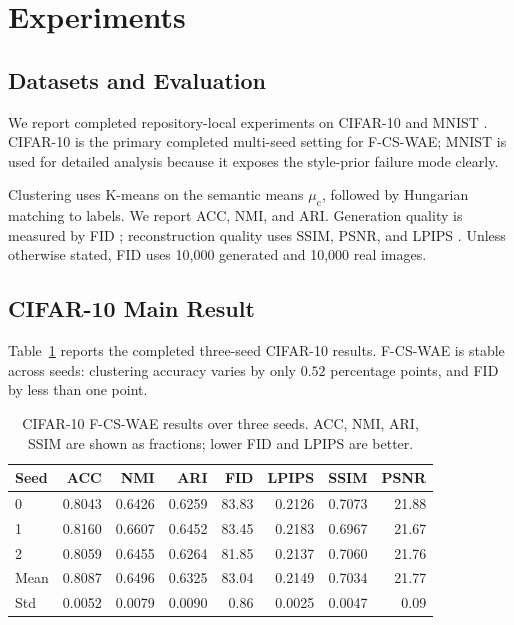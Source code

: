 \documentclass[10pt]{article}
\newcommand{\ours}{F-CS-WAE}
\begin{document}
\section{Experiments}

\subsection{Datasets and Evaluation}

We report completed repository-local experiments on CIFAR-10 \citep{krizhevsky2009learning} and MNIST \citep{lecun1998gradient}. CIFAR-10 is the primary completed multi-seed setting for \ours{}; MNIST is used for detailed analysis because it exposes the style-prior failure mode clearly.

Clustering uses K-means on the semantic means $\mu_{\mathrm{c}}$, followed by Hungarian matching to labels. We report ACC, NMI, and ARI. Generation quality is measured by FID \citep{heusel2017gans}; reconstruction quality uses SSIM, PSNR, and LPIPS \citep{zhang2018unreasonable}. Unless otherwise stated, FID uses 10,000 generated and 10,000 real images.

\subsection{CIFAR-10 Main Result}

Table~\ref{tab:cifar-main} reports the completed three-seed CIFAR-10 results. \ours{} is stable across seeds: clustering accuracy varies by only $0.52$ percentage points, and FID by less than one point.

\begin{table}[t]
\centering
\caption{CIFAR-10 \ours{} results over three seeds. ACC, NMI, ARI, SSIM are shown as fractions; lower FID and LPIPS are better.}
\label{tab:cifar-main}
\begin{tabular}{lrrrrrrr}
\toprule
Seed & ACC & NMI & ARI & FID & LPIPS & SSIM & PSNR \\
\midrule
0 & 0.8043 & 0.6426 & 0.6259 & 83.83 & 0.2126 & 0.7073 & 21.88 \\
1 & 0.8160 & 0.6607 & 0.6452 & 83.45 & 0.2183 & 0.6967 & 21.67 \\
2 & 0.8059 & 0.6455 & 0.6264 & 81.85 & 0.2137 & 0.7060 & 21.76 \\
\midrule
Mean & 0.8087 & 0.6496 & 0.6325 & 83.04 & 0.2149 & 0.7034 & 21.77 \\
Std & 0.0052 & 0.0079 & 0.0090 & 0.86 & 0.0025 & 0.0047 & 0.09 \\
\bottomrule
\end{tabular}
\end{table}
\end{document}
